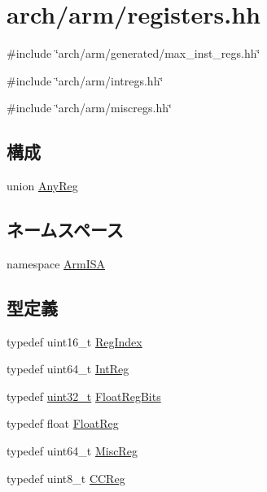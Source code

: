 \hypertarget{arm_2registers_8hh}{
\section{arch/arm/registers.hh}
\label{arm_2registers_8hh}
}
{\ttfamily \#include \char`\"{}arch/arm/generated/max\_\-inst\_\-regs.hh\char`\"{}}\par
{\ttfamily \#include \char`\"{}arch/arm/intregs.hh\char`\"{}}\par
{\ttfamily \#include \char`\"{}arch/arm/miscregs.hh\char`\"{}}\par
\subsection*{構成}
\begin{DoxyCompactItemize}
\item 
union \hyperlink{unionArmISA_1_1AnyReg}{AnyReg}
\end{DoxyCompactItemize}
\subsection*{ネームスペース}
\begin{DoxyCompactItemize}
\item 
namespace \hyperlink{namespaceArmISA}{ArmISA}
\end{DoxyCompactItemize}
\subsection*{型定義}
\begin{DoxyCompactItemize}
\item 
typedef uint16\_\-t \hyperlink{namespaceArmISA_a69329e1d929a534ff51be6cf8216b69a}{RegIndex}
\item 
typedef uint64\_\-t \hyperlink{namespaceArmISA_a0e080577527fb3e9685399f75b5caf15}{IntReg}
\item 
typedef \hyperlink{Type_8hh_a435d1572bf3f880d55459d9805097f62}{uint32\_\-t} \hyperlink{namespaceArmISA_acc2693113a7cf1a4ff1c9d63b7de6451}{FloatRegBits}
\item 
typedef float \hyperlink{namespaceArmISA_a449d6bb660f5ca613cf359f05d81a20f}{FloatReg}
\item 
typedef uint64\_\-t \hyperlink{namespaceArmISA_aa16539aa6584fd12f7d6fa868f75b4de}{MiscReg}
\item 
typedef uint8\_\-t \hyperlink{namespaceArmISA_a5834599c0196ce4accda8049e7320621}{CCReg}
\end{DoxyCompactItemize}

